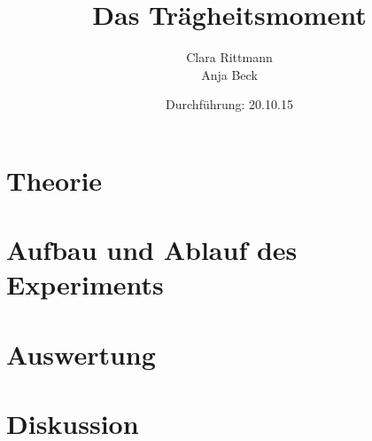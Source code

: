 \documentclass[a4,12pt]{article}
\title{Das Trägheitsmoment}
\author{Clara Rittmann \\ Anja Beck}
\date{Durchführung: 20.10.15}
\begin{document}
	\maketitle
	\date{}
	\tableofcontents
\newpage	
	\section{Theorie}
	
\newpage
	\section{Aufbau und Ablauf des Experiments}
	
\newpage

%	
%	
%	
%	

%	

	\section{Auswertung}
	
\newpage
	\section{Diskussion}
	
\end{document}
